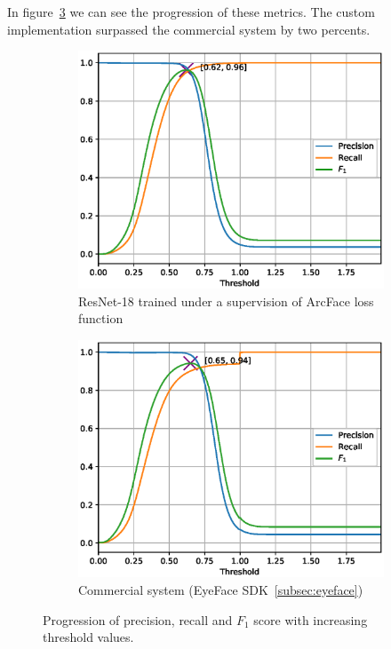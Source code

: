 In figure~\ref{fig:prft} we can see the progression of these metrics.
The custom implementation surpassed the commercial system by two percents.

\begin{figure}[H]
    \begin{subfigure}{\textwidth}
        \centering
        \includegraphics[width=0.95\columnwidth]{images/implementation/prft_fav-128_N1.eps}
        \caption{ResNet-18 trained under a supervision of ArcFace loss function}
        \label{fig:prft_arcface}
    \end{subfigure}

    \begin{subfigure}{\textwidth}
        \centering
        \includegraphics[width=0.95\columnwidth]{images/implementation/prft_eyedea.eps}
        \caption{Commercial system (EyeFace SDK~\ref{subsec:eyeface})}
        \label{fig:prft_eyedea}
    \end{subfigure}
    \caption{Progression of precision, recall and $F_1$ score with increasing threshold values.}
    \label{fig:prft}
\end{figure}

